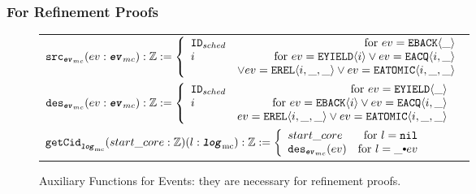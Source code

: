 \subsubsection{For Refinement Proofs}


\begin{figure}
\noindent{}

%
%

\begin{center}
\begin{tabular}{l}
$
\eventsourcefunckwd (ev : \mcevent) : \ztype := 
 \left\{\begin{array}{lr}
\schedid & \text{for } ev = \yieldbackev{\_} \\
i  & \text{for } ev =\yieldev{i}  \vee ev= \acqev{i}{\_} \\
   & \vee ev = \relev{i}{\_}{\_} \vee ev =  \atomicev{i}{\_}{\_}\\
\end{array} \right.
$\\
%
%
$
\eventdesfunckwd (ev : \mcevent) : \ztype := 
 \left\{\begin{array}{lr}
\schedid & \text{for } ev =\yieldev{\_} \\
i & \text{for } ev= \yieldbackev{i} \vee ev = \acqev{i}{\_}\\
   & ev=  \relev{i}{\_}{\_} \vee ev = \atomicev{i}{\_}{\_}\\
\end{array} \right.
$\\
%
%
$
\getcuridfromlogkwd (start\_core : \ztype) (l : \mclog): \ztype :=
 \left\{\begin{array}{lr}
start\_core & \text{for }  l = \nulllist \\
\eventdesfuncnoeq{ev} & \text{for } l = \listconsoppo{ev}{\_}\\
\end{array} \right.
$\\
\end{tabular}
\end{center}
\caption{Auxiliary Functions for Events: they are necessary for refinement proofs.}
\label{fig:chapter:conlink:auxiliary-functions-for-events-in-refinement}
\end{figure}


